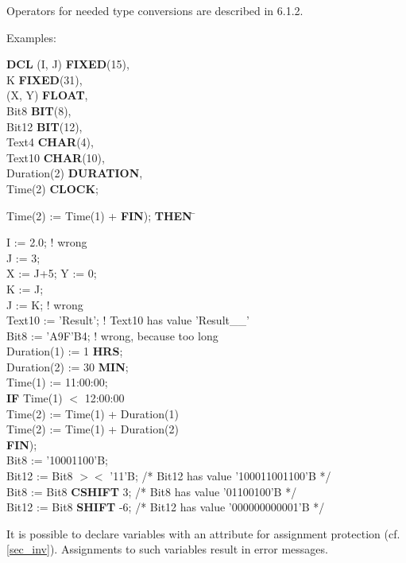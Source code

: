 Operators for needed type conversions are described in 6.1.2.

Examples:

{\bf DCL} (I, J) {\bf FIXED}(15),\\
\x K {\bf FIXED}(31),\\
\x (X, Y) {\bf FLOAT},\\
\x Bit8 {\bf BIT}(8),\\
\x Bit12 {\bf BIT}(12),\\
\x Text4 {\bf CHAR}(4),\\
\x Text10 {\bf CHAR}(10),\\
\x Duration(2) {\bf DURATION},\\
\x Time(2) {\bf CLOCK};

\begin{tabbing}
Time(2) := Time(1) + \= {\bf FIN}); \= {\bf THEN} \= \kill

I := 2.0; \> \> \> ! wrong \\
J := 3;   \> \> \> \\
X := J+5; Y := 0; \> \> \> \\
K := J;   \> \> \> \\
J := K;   \> \> \> ! wrong\\
Text10 := 'Result'; \> \> \> ! Text10 has value 'Result\_\_' \\
Bit8 := 'A9F'B4;    \> \> \>! wrong, because too long \\
Duration(1) := 1 {\bf HRS}; \> \> \>\\
Duration(2) := 30 {\bf MIN}; \> \> \> \\
Time(1) := 11:00:00; \> \> \>\\
{\bf IF} Time(1) $<$ 12:00:00 \> \\
          Time(2) := Time(1) + Duration(1) \> \\
          Time(2) := Time(1) + Duration(2) \> \\
{\bf FIN}); \> \> \\

Bit8 := '10001100'B; \> \> \> \\
Bit12 := Bit8 $><$ '11'B; \> \> \> /* Bit12 has value '100011001100'B */ \\
Bit8 := Bit8 {\bf CSHIFT} 3; \> \> \> /* Bit8 has value '01100100'B */ \\
Bit12 := Bit8 {\bf SHIFT} -6; \> \> \> /* Bit12 has value '000000000001'B */ \\
\end{tabbing}
It is possible to declare variables with an attribute for assignment
protection (cf.  \ref{sec_inv}). Assignments to such variables result in error
messages.

